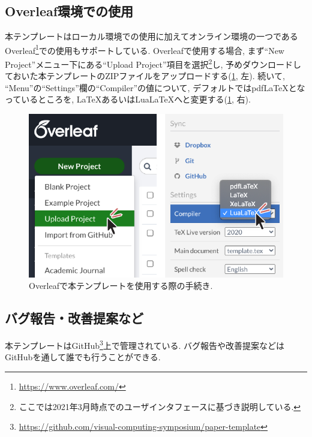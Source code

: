 \documentclass{vc}
\begin{document}
\subsection{Overleaf環境での使用}

本テンプレートはローカル環境での使用に加えてオンライン環境の一つであるOverleaf\footnote{\url{https://www.overleaf.com/}}での使用もサポートしている.
Overleafで使用する場合, まず``New Project''メニュー下にある``Upload Project''項目を選択\footnote{ここでは2021年3月時点でのユーザインタフェースに基づき説明している.}し, 予めダウンロードしておいた本テンプレートのZIPファイルをアップロードする(\cref{fig:overleaf}, 左).
続いて, ``Menu''の``Settings''欄の``Compiler''の値について, デフォルトでは{pdfLaTeX}となっているところを, LaTeXあるいはLuaLaTeXへと変更する(\cref{fig:overleaf}, 右).

\begin{figure}
  \centering
  \includegraphics[width=\columnwidth]{./figures/overleaf.pdf}
  \caption{Overleafで本テンプレートを使用する際の手続き.}
  \label{fig:overleaf}
\end{figure}

\subsection{バグ報告・改善提案など}

本テンプレートはGitHub\footnote{\url{https://github.com/visual-computing-symposium/paper-template}}上で管理されている.
バグ報告や改善提案などはGitHubを通して誰でも行うことができる.



\end{document}
